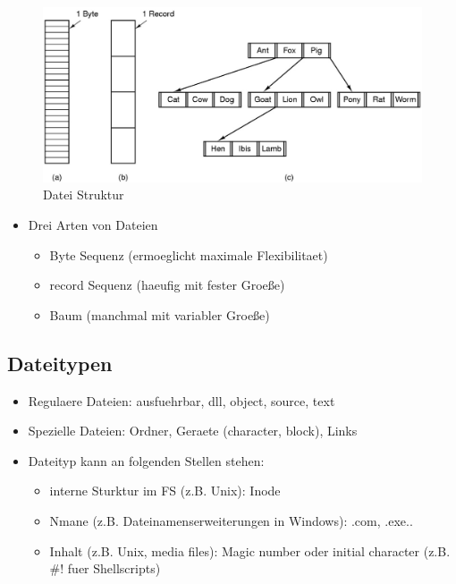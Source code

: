 \documentclass[a4paper]{scrreprt}
\begin{document}
\begin{figure}[ht]
\centering
\includegraphics[scale=0.3]{file_structure.png}
\caption{Datei Struktur}
\end{figure}

\begin{itemize}
	\item Drei Arten von Dateien
		\begin{itemize}
			\item Byte Sequenz (ermoeglicht maximale Flexibilitaet)
			\item record Sequenz (haeufig mit fester Groeße)
			\item Baum (manchmal mit variabler Groeße)
		\end{itemize}
\end{itemize}

\subsection{Dateitypen}
\begin{itemize}
	\item Regulaere Dateien: ausfuehrbar, dll, object, source, text
	\item Spezielle Dateien: Ordner, Geraete (character, block), Links
	\item Dateityp kann an folgenden Stellen stehen:
		\begin{itemize}
			\item interne Sturktur im FS (z.B. Unix): Inode
			\item Nmane (z.B. Dateinamenserweiterungen in Windows): .com, .exe..
			\item Inhalt (z.B. Unix, media files): Magic number oder initial character (z.B. \#! fuer Shellscripts)
		\end{itemize}
\end{itemize}
\end{document}

